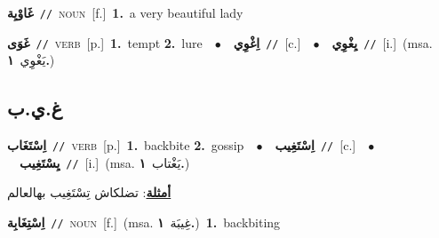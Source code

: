 \documentclass[10pt,a4paper,twoside]{article} %
\begin{document}
\begin{multicols}{2}
{\setlength\topsep{0pt}\textbf{\foreignlanguage{arabic}{غَاوْيِة}}\ {\color{gray}\texttt{//}\color{black}}\ \textsc{noun}\ [f.]\ \textbf{1.}~a very beautiful lady\ } \vspace{2mm}

{\setlength\topsep{0pt}\textbf{\foreignlanguage{arabic}{غَوَى}}\ {\color{gray}\texttt{//}\color{black}}\ \textsc{verb}\ [p.]\ \textbf{1.}~tempt  \textbf{2.}~lure\ \ $\bullet$\ \ \setlength\topsep{0pt}\textbf{\foreignlanguage{arabic}{اِغْوِي}}\ {\color{gray}\texttt{//}\color{black}}\ [c.]\ \ $\bullet$\ \ \setlength\topsep{0pt}\textbf{\foreignlanguage{arabic}{يِغْوِي}}\ {\color{gray}\texttt{//}\color{black}}\ [i.]\ \color{gray}(msa. \foreignlanguage{arabic}{يَغْوِي}~\foreignlanguage{arabic}{\textbf{١.}})\color{black}\ } \vspace{2mm}

\vspace{-3mm}
\subsection*{\color{blue}\foreignlanguage{arabic}{غ.ي.ب}\color{blue}{}} 

{\setlength\topsep{0pt}\textbf{\foreignlanguage{arabic}{اِسْتَغَاب}}\ {\color{gray}\texttt{//}\color{black}}\ \textsc{verb}\ [p.]\ \textbf{1.}~backbite  \textbf{2.}~gossip\ \ $\bullet$\ \ \setlength\topsep{0pt}\textbf{\foreignlanguage{arabic}{اِسْتَغِيب}}\ {\color{gray}\texttt{//}\color{black}}\ [c.]\ \ $\bullet$\ \ \setlength\topsep{0pt}\textbf{\foreignlanguage{arabic}{يِسْتَغِيب}}\ {\color{gray}\texttt{//}\color{black}}\ [i.]\ \color{gray}(msa. \foreignlanguage{arabic}{يَغْتاب}~\foreignlanguage{arabic}{\textbf{١.}})\color{black}\  \begin{flushright}\color{gray}\foreignlanguage{arabic}{\textbf{\underline{\foreignlanguage{arabic}{أمثلة}}}: تضلكاش تِسْتَغِيب بهالعالم}\end{flushright}\color{black}} \vspace{2mm}

{\setlength\topsep{0pt}\textbf{\foreignlanguage{arabic}{اِسْتِغَابِة}}\ {\color{gray}\texttt{//}\color{black}}\ \textsc{noun}\ [f.]\ \color{gray}(msa. \foreignlanguage{arabic}{غِيبَة}~\foreignlanguage{arabic}{\textbf{١.}})\color{black}\ \textbf{1.}~backbiting\ } \vspace{2mm}


\end{multicols}
\end{document}
